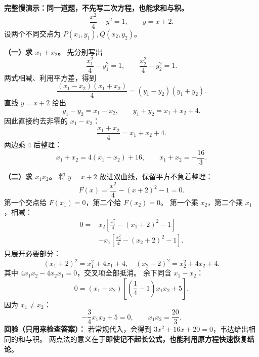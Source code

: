 \begin{examplebox}
\textbf{完整慢演示：同一道题，不先写二次方程，也能求和与积。}
\[
 \frac{x^2}{4}-y^2=1,\qquad y=x+2.
\]
设两个不同交点为 $P(x_1,y_1),Q(x_2,y_2)$。

\textbf{（一）求 $x_1+x_2$。} 先分别写出
\[
 \frac{x_1^2}{4}-y_1^2=1,\qquad
 \frac{x_2^2}{4}-y_2^2=1.
\]
两式相减、利用平方差，得到
\[
 \frac{(x_1-x_2)(x_1+x_2)}4
 =(y_1-y_2)(y_1+y_2).
\]
直线 $y=x+2$ 给出
\[
 y_1-y_2=x_1-x_2,\qquad y_1+y_2=x_1+x_2+4.
\]
因此直接约去非零的 $x_1-x_2$：
\[
 \frac{x_1+x_2}{4}=x_1+x_2+4.
\]
两边乘 $4$ 后整理：
\[
 x_1+x_2=4(x_1+x_2)+16,
 \qquad \boxed{x_1+x_2=-\frac{16}{3}}.
\]

\textbf{（二）求 $x_1x_2$。} 将 $y=x+2$ 放进双曲线，保留平方不急着整理：
\[
 F(x)=\frac{x^2}{4}-(x+2)^2-1=0.
\]
第一个交点给 $F(x_1)=0$，第二个给 $F(x_2)=0$。
第一个乘 $x_2$，第二个乘 $x_1$，相减：
\[
 \begin{aligned}
 0={}&x_2\left[\frac{x_1^2}{4}-(x_1+2)^2-1\right]\\
   &-x_1\left[\frac{x_2^2}{4}-(x_2+2)^2-1\right].
 \end{aligned}
\]
只展开必要部分：
\[
 (x_1+2)^2=x_1^2+4x_1+4,\quad
 (x_2+2)^2=x_2^2+4x_2+4.
\]
其中 $4x_1x_2-4x_2x_1=0$，交叉项全部抵消。
余下同含 $x_1-x_2$：
\[
 0=(x_1-x_2)\left[\left(\frac14-1\right)x_1x_2+5\right].
\]
因为 $x_1\ne x_2$：
\[
 -\frac34x_1x_2+5=0,
 \qquad \boxed{x_1x_2=\frac{20}{3}}.
\]
\textbf{回验（只用来检查答案）：} 若常规代入，会得到
$3x^2+16x+20=0$，韦达给出相同的和与积。
两点法的意义在于\textbf{即使记不起长公式，也能利用原方程快速恢复结论}。
\end{examplebox}
\clearpage
